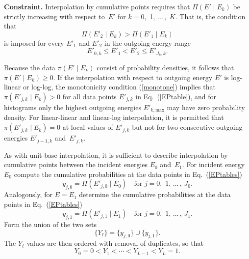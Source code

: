 \textbf{Constraint.}
Interpolation by cumulative points requires that $\Pi( E' \mid E_k)$
be strictly increasing with respect to~$E'$ for $k = 0$,~1, $\ldots\,$,~$K$.  
That is, the 
condition that
\begin{equation}
    \Pi( E'_2 \mid E_k) > \Pi( E'_1 \mid E_k)
  \label{monotone}
\end{equation}
is imposed
for every $E'_1$ and $E'_2$ in the outgoing energy
range 
$$
  E'_{0,k} \le E'_1 < E'_2 \le E'_{J_k,k}.
$$

Because the data $\pi( E' \mid E_k)$ consist of probability densities,
it follows that $\pi( E' \mid E_k) \ge 0$.  If the interpolation with respect to
outgoing energy $E'$ is log-linear or log-log, the monotonicity condition
(\ref{monotone}) implies that $\pi(E'_{j,k} \mid E_k ) > 0$ for all data
points $E'_{j,k}$ in Eq.~(\ref{EPtable}), and for histograms only the
highest outgoing energies $E'_{k,\text{max}}$ may have zero probability density.
For linear-linear and linear-log interpolation, it is permitted that
$\pi(E'_{j,k} \mid E_k ) = 0$ at local values of $E'_{j,k}$ but not for
 two consecutive outgoing energies $E'_{j-1,k}$ and~$E'_{j,k}$.

As with unit-base interpolation, it is sufficient to describe interpolation
by cumulative points between the incident energies $E_0$ and~$E_1$.
For incident energy~$E_0$ compute the cumulative probabilities
at the data points in Eq.~(\ref{EPtables})
\begin{equation}
  y_{j,0} = \Pi( E'_{j,0} \mid E_0) \quad
  \text{for  $j = 0,$ 1, $\ldots\,$, $J_0$}.
 \label{cum-prob0}
\end{equation}
Analogously, for $E = E_1$ determine the cumulative probabilities
at the data points in Eq.~(\ref{EPtables})
\begin{equation}
  y_{j,1} = \Pi( E'_{j,1} \mid E_1) \quad
  \text{for  $j = 0,$ 1, $\ldots\,$, $J_1$}.
  \label{cum-prob1}
\end{equation}
Form the union of the two sets
$$
  \{ Y_\ell \} = \{ y_{j,0} \} \cup \{ y_{j,1} \}.
$$
The $Y_\ell$ values are then ordered with removal of duplicates, so that
\begin{equation}
  Y_0 = 0 < Y_1 < \cdots < Y_{L-1} < Y_L = 1.
 \label{order-cum-prob}
\end{equation}

